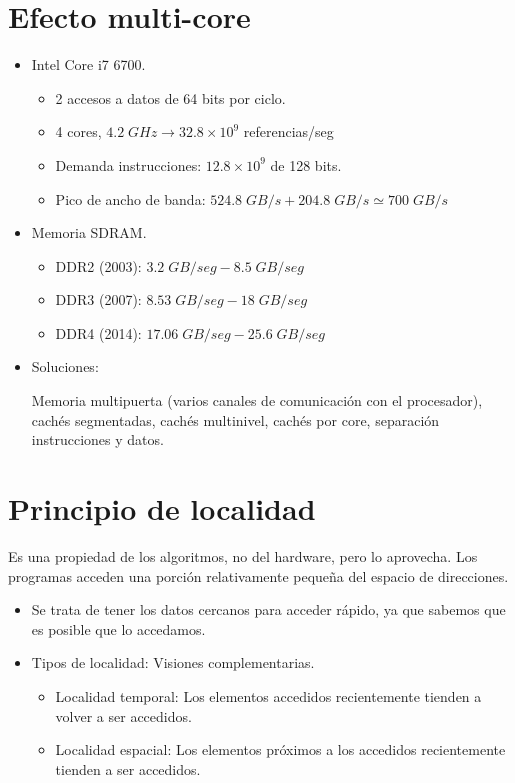 \documentclass[12pt, twoside, openright]{report} %
\begin{document}
    \section{Efecto multi-core}
    \begin{itemize}
      \item Intel Core i7 6700.
      \begin{itemize}
        \item 2 accesos a datos de 64 bits por ciclo.
        \item 4 cores, $4.2 \; GHz \rightarrow 32.8 \times 10^9$ referencias/seg
        \item Demanda instrucciones: $12.8 \times 10^9$ de 128 bits.
        \item Pico de ancho de banda: $524.8 \; GB/s + 204.8 \; GB/s \simeq 700 \; GB/s$
      \end{itemize}


      \item Memoria SDRAM.
      \begin{itemize}
        \item DDR2 (2003): $3.2\; GB/seg - 8.5\; GB/seg$
        \item DDR3 (2007): $8.53\; GB/seg - 18\; GB/seg$
        \item DDR4 (2014): $17.06\; GB/seg - 25.6\; GB/seg$
      \end{itemize}


      \item Soluciones:

Memoria multipuerta (varios canales de comunicación con el procesador), cachés segmentadas, cachés
multinivel, cachés por core, separación instrucciones y
datos.
    \end{itemize}

  \section{Principio de localidad}
     Es una propiedad de los algoritmos, no del
    hardware, pero lo aprovecha. Los programas acceden una porción
    relativamente pequeña del espacio de direcciones.

    \begin{itemize}
    
    \item
      Se trata de tener los datos cercanos para acceder rápido, ya que
      sabemos que es posible que lo accedamos.
    \item
      Tipos de localidad: Visiones complementarias.

      \begin{itemize}
      
      \item
        Localidad temporal: Los elementos accedidos recientemente
        tienden a volver a ser accedidos.
      \item
        Localidad espacial: Los elementos próximos a los accedidos
        recientemente tienden a ser accedidos.
      \end{itemize}
    \end{itemize}
\end{document}
